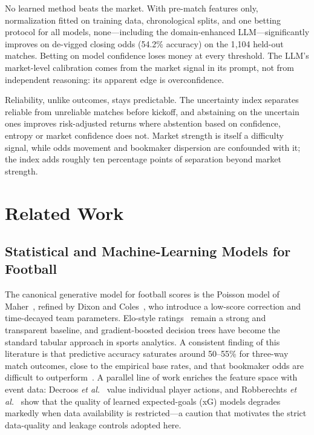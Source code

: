 \documentclass[10pt]{article}
\begin{document}
No learned method beats the market. With pre-match features only, normalization
fitted on training data, chronological splits, and one betting protocol for all
models, none---including the domain-enhanced LLM---significantly improves on
de-vigged closing odds (54.2\% accuracy) on the 1{,}104 held-out matches. Betting
on model confidence loses money at every threshold. The LLM's market-level
calibration comes from the market signal in its prompt, not from independent
reasoning: its apparent edge is overconfidence.

Reliability, unlike outcomes, stays predictable. The uncertainty index separates
reliable from unreliable matches before kickoff, and abstaining on the uncertain
ones improves risk-adjusted returns where abstention based on confidence,
entropy or market confidence does not. Market strength is itself a difficulty
signal, while odds movement and bookmaker dispersion are confounded with it; the
index adds roughly ten percentage points of separation beyond market strength.

\section{Related Work}
\label{sec:related}

\subsection{Statistical and Machine-Learning Models for Football}
The canonical generative model for football scores is the Poisson model of
Maher~\cite{maher1982}, refined by Dixon and Coles~\cite{dixoncoles1997}, who
introduce a low-score correction and time-decayed team parameters. Elo-style
ratings~\cite{elo1978} remain a strong and transparent baseline, and
gradient-boosted decision trees have become the standard tabular approach in
sports analytics. A consistent finding of this literature is that predictive
accuracy saturates around 50--55\% for three-way match outcomes, close to the
empirical base rates, and that bookmaker odds are difficult to
outperform~\cite{hvattum2010,spann2009}. A parallel line of work enriches the
feature space with event data: Decroos \emph{et al.}~\cite{decroos2019} value
individual player actions, and Robberechts \emph{et al.}~\cite{robberechts2021}
show that the quality of learned expected-goals (xG) models degrades markedly
when data availability is restricted---a caution that motivates the strict
data-quality and leakage controls adopted here.
\end{document}
